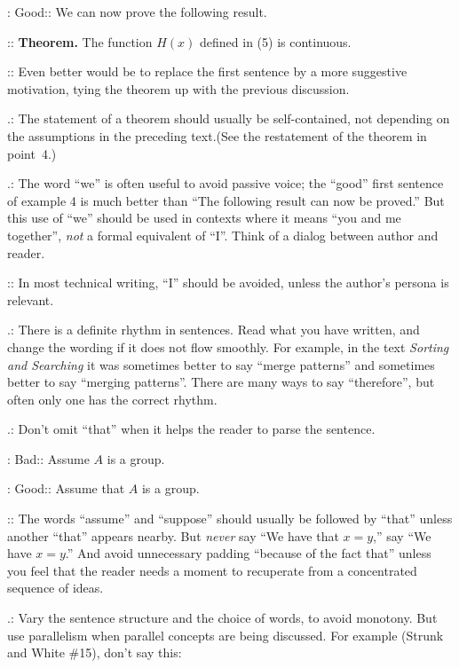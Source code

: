 \yskip
\display 70pt: {Good:}: We can now prove the following result.

\display 70pt:: {\bf Theorem.} The function $H(x)$ defined in (5) is continuous.

\yskip
\disleft 20pt:: Even better would be to replace the first sentence by a more
	suggestive motivation, tying the theorem up with the previous discussion.

\yskip
{}.: The statement of a theorem should usually be self-contained,
	not depending on the assumptions in the preceding text.\xskip  (See the
	restatement of the theorem in point~4.)

\yskip
{}.: The word ``we'' is often useful to avoid passive voice; the
	``good'' first sentence of example 4 is much better than ``The
	following result can now be proved.''  But this use of ``we'' should be
	used in contexts where it means ``you and me together'', {\sl not\/}
	a formal equivalent of ``I''.  Think of a dialog between author and
	reader.

\vskip 2pt
\disleft 20pt:: In most technical writing, ``I'' should be avoided, unless the
author's persona is relevant.

\yskip
{}.: There is a definite rhythm in sentences.  Read what you have
	written, and change the wording if it does not flow smoothly.  For example,
	 in the text {\sl Sorting and Searching\/} it was sometimes better to say
	``merge patterns'' and sometimes better to say ``merging patterns''.
	There are many ways to say ``therefore'', but often only one has the
	correct rhythm.

\yskip

.: Don't omit ``that'' when it helps the reader to parse the sentence.

\yskip
\display 70pt: {Bad:}: Assume $A$ is a group.

\dskip
\display 70pt: {Good:}: Assume that $A$ is a group.

\yskip
\disleft 20pt:: The words ``assume'' and ``suppose'' should usually be followed
	by ``that'' unless another ``that'' appears nearby.  But {\sl never\/}
	say ``We have that $x=y$,'' say ``We have $x=y$.''  And avoid unnecessary
	padding ``because of the fact that'' unless you feel that the reader
	needs a moment to recuperate from a concentrated sequence of ideas.

\yskip

.: Vary the sentence structure and the choice of words, to avoid
	monotony.  But use parallelism when parallel concepts are being discussed.
	For example (Strunk and White \#15), don't say this:

